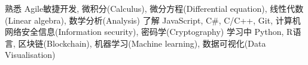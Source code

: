 
\begin{cvskills}
	\cvskill
		{熟悉}
		{Agile敏捷开发,\enskip 
		微积分(Calculus),\enskip
		微分方程(Differential equation), \enskip
		线性代数(Linear algebra), \enskip
		数学分析(Analysis)}
	\cvskill
		{了解}
		{JavaScript,\enskip 
		C\#,\enskip 
		C/C++, \enskip
		Git,\enskip
		计算机网络安全信息(Information security),\enskip
		密码学(Cryptography)}
	\cvskill
		{学习中}
		{
		Python,\enskip 
		R语言,\enskip
		区块链(Blockchain),\enskip
		机器学习(Machine learning), \enskip
		数据可视化(Data Visualisation)}
\end{cvskills}

